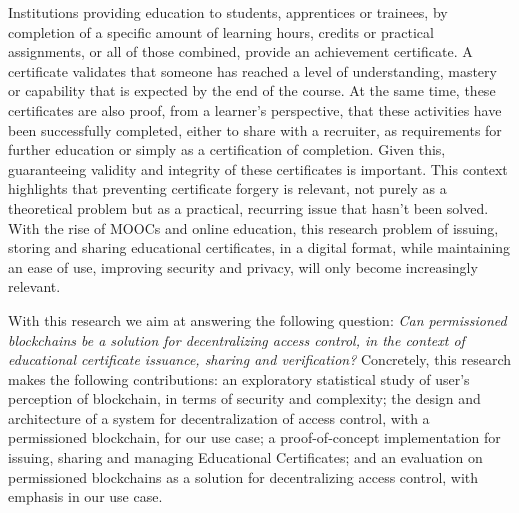 Institutions providing education to students, apprentices or trainees, by completion of a specific amount of learning hours, credits or practical assignments, or all of those combined, provide an achievement certificate. A certificate validates that someone has reached a level of understanding, mastery or capability that is expected by the end of the course. At the same time, these certificates are also proof, from a learner's perspective, that these activities have been successfully completed, either to share with a recruiter, as requirements for further education or simply as a certification of completion. Given this, guaranteeing validity and integrity of these certificates is important. This context highlights that preventing certificate forgery is relevant, not purely as a theoretical problem but as a practical, recurring issue that hasn't been solved. With the rise of MOOCs and online education, this research problem of issuing, storing and sharing educational certificates, in a digital format, while maintaining an ease of use, improving security and privacy, will only become increasingly relevant.

With this research we aim at answering the following question: \textit{Can permissioned blockchains be a solution for decentralizing access control, in the context of educational certificate issuance, sharing and verification?} Concretely, this research makes the following contributions: an exploratory statistical study of user's perception of blockchain, in terms of security and complexity; the design and architecture of a system for decentralization of access control, with a permissioned blockchain, for our use case; a proof-of-concept implementation for issuing, sharing and managing Educational Certificates; and an evaluation on permissioned blockchains as a solution for decentralizing access control, with emphasis in our use case.

